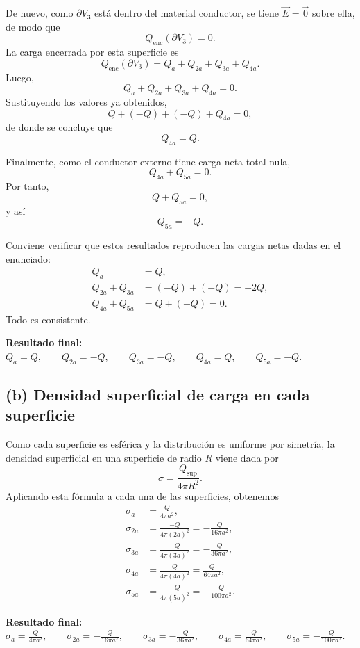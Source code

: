 \documentclass[11pt]{article}
\newcommand{\resultadofinal}[1]{%
  \par\medskip
  \noindent\textbf{Resultado final:} #1\par
}
\begin{document}
De nuevo, como $\partial V_3$ está dentro del material conductor, se tiene $\vec E=\vec 0$ sobre ella, de modo que
\begin{equation*}
Q_{\mathrm{enc}}(\partial V_3)=0.
\end{equation*}
La carga encerrada por esta superficie es
\begin{equation*}
Q_{\mathrm{enc}}(\partial V_3)=Q_a+Q_{2a}+Q_{3a}+Q_{4a}.
\end{equation*}
Luego,
\begin{equation*}
Q_a+Q_{2a}+Q_{3a}+Q_{4a}=0.
\end{equation*}
Sustituyendo los valores ya obtenidos,
\begin{equation*}
Q+(-Q)+(-Q)+Q_{4a}=0,
\end{equation*}
de donde se concluye que
\begin{equation*}
\boxed{Q_{4a}=Q.}
\end{equation*}

Finalmente, como el conductor externo tiene carga neta total nula,
\begin{equation*}
Q_{4a}+Q_{5a}=0.
\end{equation*}
Por tanto,
\begin{equation*}
Q+Q_{5a}=0,
\end{equation*}
y así
\begin{equation*}
\boxed{Q_{5a}=-Q.}
\end{equation*}

Conviene verificar que estos resultados reproducen las cargas netas dadas en el enunciado:
\begin{align*}
Q_a &= Q,\\
Q_{2a}+Q_{3a} &= (-Q)+(-Q)=-2Q,\\
Q_{4a}+Q_{5a} &= Q+(-Q)=0.
\end{align*}
Todo es consistente.

\resultadofinal{$\boxed{Q_a=Q,\qquad Q_{2a}=-Q,\qquad Q_{3a}=-Q,\qquad Q_{4a}=Q,\qquad Q_{5a}=-Q.}$}

\subsection*{(b) Densidad superficial de carga en cada superficie}

Como cada superficie es esférica y la distribución es uniforme por simetría, la densidad superficial en una superficie de radio $R$ viene dada por
\begin{equation*}
\sigma=\frac{Q_{\mathrm{sup}}}{4\pi R^2}.
\end{equation*}
Aplicando esta fórmula a cada una de las superficies, obtenemos
\begin{align*}
\sigma_a &= \frac{Q}{4\pi a^2},\\
\sigma_{2a} &= \frac{-Q}{4\pi(2a)^2}=-\frac{Q}{16\pi a^2},\\
\sigma_{3a} &= \frac{-Q}{4\pi(3a)^2}=-\frac{Q}{36\pi a^2},\\
\sigma_{4a} &= \frac{Q}{4\pi(4a)^2}=\frac{Q}{64\pi a^2},\\
\sigma_{5a} &= \frac{-Q}{4\pi(5a)^2}=-\frac{Q}{100\pi a^2}.
\end{align*}

\resultadofinal{$\boxed{\sigma_a = \frac{Q}{4\pi a^2}, \qquad
\sigma_{2a} = -\frac{Q}{16\pi a^2}, \qquad
\sigma_{3a} = -\frac{Q}{36\pi a^2}, \qquad
\sigma_{4a} = \frac{Q}{64\pi a^2}, \qquad
\sigma_{5a} = -\frac{Q}{100\pi a^2}.}$}
\end{document}
